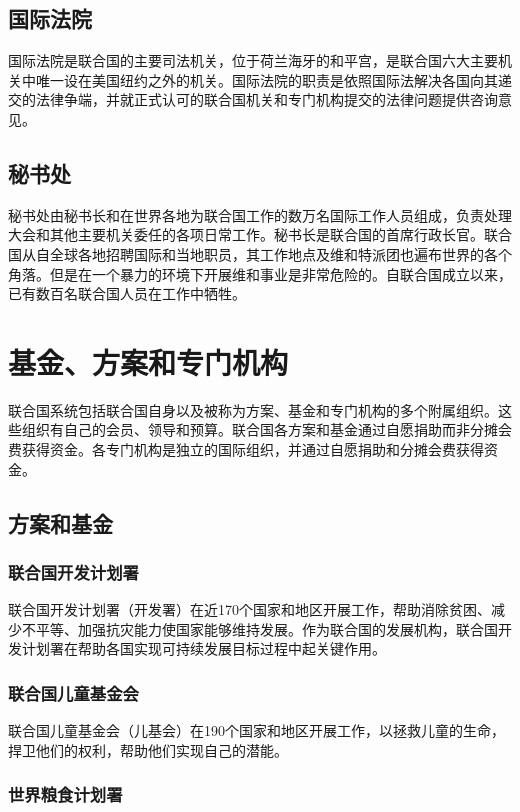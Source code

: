 \documentclass[a4paper,openany]{book}
\begin{document}
\subsection{国际法院}
国际法院是联合国的主要司法机关，位于荷兰海牙的和平宫，是联合国六大主要机关中唯一设在美国纽约之外的机关。国际法院的职责是依照国际法解决各国向其递交的法律争端，并就正式认可的联合国机关和专门机构提交的法律问题提供咨询意见。

\subsection{秘书处}
秘书处由秘书长和在世界各地为联合国工作的数万名国际工作人员组成，负责处理大会和其他主要机关委任的各项日常工作。秘书长是联合国的首席行政长官。联合国从自全球各地招聘国际和当地职员，其工作地点及维和特派团也遍布世界的各个角落。但是在一个暴力的环境下开展维和事业是非常危险的。自联合国成立以来，已有数百名联合国人员在工作中牺牲。

\section{基金、方案和专门机构}

联合国系统包括联合国自身以及被称为方案、基金和专门机构的多个附属组织。这些组织有自己的会员、领导和预算。联合国各方案和基金通过自愿捐助而非分摊会费获得资金。各专门机构是独立的国际组织，并通过自愿捐助和分摊会费获得资金。

\subsection{方案和基金}

\subsubsection{联合国开发计划署}

联合国开发计划署（开发署）在近170个国家和地区开展工作，帮助消除贫困、减少不平等、加强抗灾能力使国家能够维持发展。作为联合国的发展机构，联合国开发计划署在帮助各国实现可持续发展目标过程中起关键作用。

\subsubsection{联合国儿童基金会}

联合国儿童基金会（儿基会）在190个国家和地区开展工作，以拯救儿童的生命，捍卫他们的权利，帮助他们实现自己的潜能。

\subsubsection{世界粮食计划署}
\end{document}
